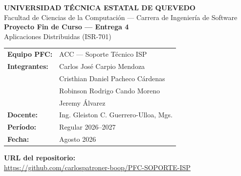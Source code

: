 \documentclass[11pt,letterpaper]{article}
\begin{document}
\begin{center}
{\Large\bfseries UNIVERSIDAD TÉCNICA ESTATAL DE QUEVEDO}\\[2pt]
{\large Facultad de Ciencias de la Computación --- Carrera de Ingeniería de Software}\\[18pt]
{\Large\bfseries Proyecto Fin de Curso --- Entrega 4}\\[4pt]
{\large Aplicaciones Distribuidas (ISR-701)}\\[24pt]

\begin{tabular}{ll}
\textbf{Equipo PFC:} & ACC --- Soporte Técnico ISP \\[6pt]
\textbf{Integrantes:} & Carlos José Carpio Mendoza \\
                        & Cristhian Daniel Pacheco Cárdenas \\
                        & Robinson Rodrigo Cando Moreno \\
                        & Jeremy Álvarez \\[6pt]
\textbf{Docente:} & Ing. Gleiston C. Guerrero-Ulloa, Mgs. \\[6pt]
\textbf{Período:} & Regular 2026--2027 \\[6pt]
\textbf{Fecha:} & Agosto 2026 \\
\end{tabular}

\vfill

\textbf{URL del repositorio:}\\[6pt]
{\Large \url{https://github.com/carlospatroner-boop/PFC-SOPORTE-ISP}}

\vfill
\end{center}
\end{document}
